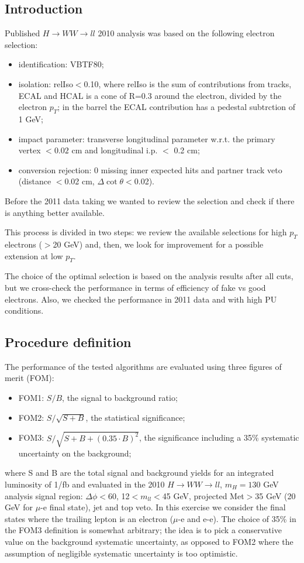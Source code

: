 \subsection{Introduction}
Published $H\rightarrow WW\rightarrow ll$ 2010 analysis was based on the following electron selection:
\begin{itemize}
\item identification: VBTF80;
\item isolation: relIso$<$0.10, where relIso is the sum of contributions from tracks, ECAL and HCAL is a cone of R=0.3 around the electron, 
divided by the electron $p_T$; in the barrel the ECAL contribution has a pedestal subtrction of 1 GeV;
\item impact parameter: transverse longitudinal parameter w.r.t. the primary vertex $<0.02$ cm and longitudinal i.p. $<$ 0.2 cm;
\item conversion rejection: 0 missing inner expected hits and partner track veto (distance $<$0.02 cm, $\Delta \cot \theta <$0.02).
\end{itemize}
Before the 2011 data taking we wanted to review the selection and check if there is anything better available.

This process is divided in two steps: we review the available selections for high $p_T$ electrons ($>$20 GeV) and, then, 
we look for improvement for a possible extension at low $p_T$.

The choice of the optimal selection is based on the analysis results after all cuts, 
but we cross-check the performance in terms of efficiency of fake vs good electrons.
Also, we checked the performance in 2011 data and with high PU conditions.

\subsection{Procedure definition}
The performance of the tested algorithms are evaluated using three figures of merit (FOM):
\begin{itemize}
\item FOM1: $S/B$, the signal to background ratio;
\item FOM2: $S/\sqrt{S+B}$, the statistical significance;
\item FOM3: $S/\sqrt{S+B+(0.35 \cdot B)^2}$, the significance including a 35\% systematic uncertainty on the background;
\end{itemize}
where S and B are the total signal and background yields for an integrated luminosity of 1/fb and evaluated in the 2010 
$H\rightarrow WW\rightarrow ll$, $m_H=130$ GeV analysis signal region:
$\Delta\phi < 60$, 12$< m_{ll} <$45 GeV, projected Met$>$35 GeV (20 GeV for $\mu$-e final state), jet and top veto.
In this exercise we consider the final states where the trailing lepton is an electron ($\mu$-e and e-e).
The choice of 35\% in the FOM3 definition is somewhat arbitrary; the idea is to pick a conservative value on the background systematic uncertainty, 
as opposed to FOM2 where the assumption of negligible systematic uncertainty is too optimistic.

